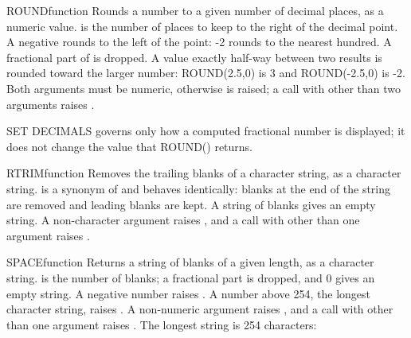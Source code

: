 \begin{XbaseEntry}{ROUND}{function}
Rounds a number to a given number of decimal places, as a numeric value.
\Syntax
{}
\Usage
{} is the number of places to keep to the right of the decimal point. A negative  rounds to the left of the point: -2 rounds to the nearest hundred. A fractional part of  is dropped. A value exactly half-way between two results is rounded toward the larger number: ROUND(2.5,0) is 3 and ROUND(-2.5,0) is -2. Both arguments must be numeric, otherwise  is raised; a call with other than two arguments raises .

SET DECIMALS governs only how a computed fractional number is displayed; it does not change the value that ROUND() returns.
\Examples
{}
\end{XbaseEntry}

\begin{XbaseEntry}{RTRIM}{function}
Removes the trailing blanks of a character string, as a character string.
\Syntax
{}
\Usage
{} is a synonym of  and behaves identically: blanks at the end of the string are removed and leading blanks are kept. A string of blanks gives an empty string. A non-character argument raises , and a call with other than one argument raises .
\Examples
{}
\end{XbaseEntry}

\begin{XbaseEntry}{SPACE}{function}
Returns a string of blanks of a given length, as a character string.
\Syntax
{}
\Usage
{} is the number of blanks; a fractional part is dropped, and 0 gives an empty string. A negative number raises . A number above 254, the longest character string, raises . A non-numeric argument raises , and a call with other than one argument raises .
\Examples
{}
The longest string is 254 characters:
\end{XbaseEntry}

